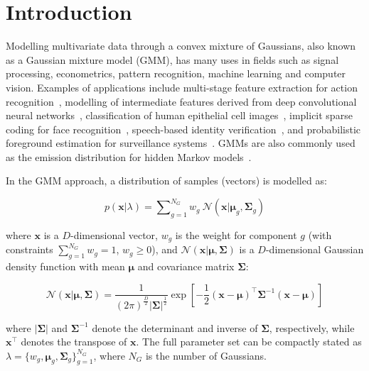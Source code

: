 \documentclass[10pt,a4paper]{article}
\def\Vec#1{{\boldsymbol{#1}}}
\def\Mat#1{{\boldsymbol{#1}}}
\begin{document}
\section{Introduction}

Modelling multivariate data through a convex mixture of Gaussians, also known as a Gaussian mixture model (GMM),
has many uses in fields such as signal processing, econometrics, pattern recognition, machine learning and computer vision.
Examples of applications include
multi-stage feature extraction for action recognition~\cite{Carvajal_2016a},
modelling of intermediate features derived from deep convolutional neural networks~\cite{Ge_ICIP_2015,Ge_2016,LeCun_Nature_2015},
classification of human epithelial cell images~\cite{Wiliem_PR_2014},
implicit sparse coding for face recognition~\cite{Wong_2014},
speech-based identity verification~\cite{Reynolds_2000},
and probabilistic foreground estimation for surveillance systems~\cite{Reddy_2013}.
GMMs are also commonly used as the emission distribution for hidden Markov models~\cite{Bilmes98}.

In the GMM approach, a distribution of samples (vectors) is modelled as:

\vspace{-3ex}
\begin{equation}
  p(\Vec{x} | \lambda) = \sum\nolimits_{g=1}^{N_G} w_g ~ {{\mathcal{N}}}( \Vec{x} | \Vec{\mu}_g, \Mat{\Sigma}_g )
  \label{eqn:gmm_prob}
\end{equation}%

\vspace{-2ex}
where $\Vec{x}$ is a $D$-dimensional vector,
$w_g$ is the weight for component $g$ (with constraints $\sum\nolimits_{g=1}^{N_G} w_g = 1$, $w_g \geq 0$),
and
${{\mathcal{N}}}( \Vec{x} | \Vec{\mu}, \Mat{\Sigma})$ is a $D$-dimensional Gaussian density function with mean $\Vec{\mu}$ and covariance matrix $\Mat{\Sigma}$:

\vspace{-3ex}
\begin{equation}
  {{\mathcal{N}}}( \Vec{x} | \Vec{\mu}, \Mat{\Sigma} )  = 
  \frac{1}{ (2\pi)^{\frac{D}{2}} | \Mat{\Sigma}|^{\frac{1}{2}} }
  \exp \left[ -\frac{1}{2} (\Vec{x}-\Vec{\mu})^\top \Mat{\Sigma}^{-1} (\Vec{x}-\Vec{\mu}) \right]
  \label{eqn:gaussian}
\end{equation}%

\vspace{-2ex}
where $|\Mat{\Sigma}|$ and $\Mat{\Sigma}^{-1}$ denote the determinant and inverse of $\Mat{\Sigma}$, respectively,
while $\Vec{x}^\top$ denotes the transpose of $\Vec{x}$.
The full parameter set can be compactly stated as {\small $\lambda = \{ w_g, \Vec{\mu}_g, \Mat{\Sigma}_g \}_{g=1}^{N_G}$},
where $N_G$ is the number of Gaussians.
\end{document}
